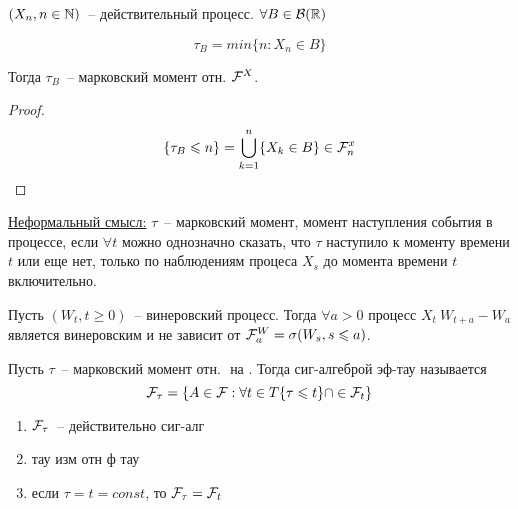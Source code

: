 \begin{example}
$(X_n, n \in \mathbb{N})$~-- действительный процесс. $\forall B \in \mathcal{B}(\mathbb{R})$

$$\tau_B = min\{n: X_n \in B\}$$

Тогда $\tau_B$~-- марковский момент отн. $\mathcal{F}^X$.
\end{example}
\begin{proof}
$$\{\tau_B \leqslant n\} = \bigcup_{k = 1}^{n}\{X_k \in B\} \in \mathcal{F}_n^x$$
\end{proof}

\underline{Неформальный смысл:} $\tau$~-- марковский момент, момент наступления
события в процессе, если $\forall t$ можно однозначно сказать, что $\tau$ наступило
к моменту времени $t$ или еще нет, только по наблюдениям процеса $X_s$ до момента времени
$t$ включительно.

\begin{theorem}
Пусть $(W_t, t \geq 0)$~-- винеровский процесс. Тогда 
$\forall a > 0$ процесс $X_t \ W_{t+a} - W_a$ является винеровским и
не зависит от $\mathcal{F}_a^W = \sigma(W_s, s \leqslant a)$.
\end{theorem}

\begin{definition}
Пусть $\tau$~-- марковский момент отн. $ $ на $ $. Тогда сиг-алгеброй эф-тау
называется
$$\mathcal{F}_\tau = \{A \in \mathcal{F}: \forall t \in T \{\tau \leqslant t\} \cap \in \mathcal{F}_t\}$$
\end{definition}
\begin{enumerate}
\item $\mathcal{F}_\tau$~-- действительно сиг-алг
\item тау изм отн ф тау
\item если $\tau = t = const$, то $\mathcal{F}_\tau = \mathcal{F}_t$
\end{enumerate}

